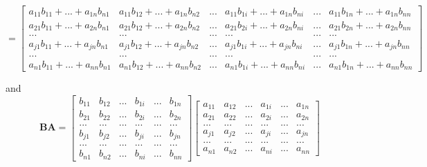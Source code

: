 \documentclass{article}
\begin{document}
\begin{enumerate}
		$$= \begin{bmatrix}
		a_{11} b_{11} + ... + a_{1n} b_{n1}  & a_{11} b_{12} + ... + a_{1n} b_{n2} & ... & a_{11} b_{1i} + ... + a_{1n} b_{ni} & ... & a_{11} b_{1n} + ... + a_{1n} b_{nn} \\
		a_{21} b_{11} + ... + a_{2n} b_{n1}  & a_{21} b_{12} + ... + a_{2n} b_{n2} & ... & a_{21} b_{2i} + ... + a_{2n} b_{ni} & ... & a_{21} b_{2n} + ... + a_{2n} b_{nn} \\
		...       &      ...      & ... &      ...      & ... &      ...      \\
		a_{j1} b_{11} + ... + a_{jn} b_{n1}  & a_{j1} b_{12} + ... + a_{jn} b_{n2} & ... & a_{j1} b_{1i} + ... + a_{jn} b_{ni} & ... & a_{j1} b_{1n} + ... + a_{jn} b_{nn} \\
		...       &      ...      & ... &      ...      & ... &      ...      \\
		a_{n1} b_{11} + ... + a_{nn} b_{n1}  & a_{n1} b_{12} + ... + a_{nn} b_{n2} & ... & a_{n1} b_{1i} + ... + a_{nn} b_{ni} & ... & a_{n1} b_{1n} + ... + a_{nn} b_{nn} 
		\end{bmatrix}$$
		
		
		and 
		$$\textbf{BA} = \begin{bmatrix} 
		b_{11}  & b_{12} & ... & b_{1i} & ... & b_{1n} \\
		b_{21}  & b_{22} & ... & b_{2i} & ... & b_{2n} \\
		...    &  ...   & ... &  ...   & ... & ...    \\
		b_{j1}  & b_{j2} & ... & b_{ji} & ... & b_{jn} \\
		...    &  ...   & ... &  ...   & ... & ...    \\
		b_{n1}  & b_{n2} & ... & b_{ni} & ... & b_{nn}
		\end{bmatrix} \begin{bmatrix}
		a_{11}  & a_{12} & ... & a_{1i} & ... & a_{1n} \\
		a_{21}  & a_{22} & ... & a_{2i} & ... & a_{2n} \\
		...    &  ...   & ... &  ...   & ... & ...    \\
		a_{j1}  & a_{j2} & ... & a_{ji} & ... & a_{jn} \\
		...    &  ...   & ... &  ...   & ... & ...    \\
		a_{n1}  & a_{n2} & ... & a_{ni} & ... & a_{nn}
		\end{bmatrix} $$
	

\end{enumerate}
\end{document}

